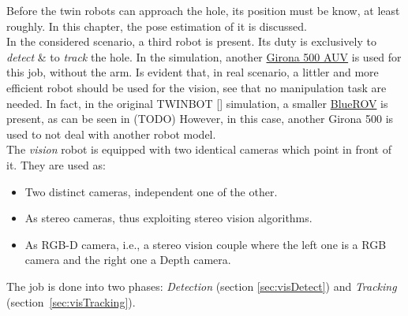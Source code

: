 Before the twin robots can approach the hole, its position must be know, at least roughly. In this chapter, the pose estimation of it is discussed.\\
In the considered scenario, a third robot is present. Its duty is exclusively to \textit{detect} \& to \textit{track} the hole. In the simulation, another \href{https://cirs.udg.edu/auvs-technology/auvs/girona-500-auv/}{Girona 500 AUV} is used for this job, without the arm. Is evident that, in real scenario, a littler and more efficient robot should be used for the vision, see that no manipulation task are needed. In fact, in the original TWINBOT [\cite{TWINBOT2019}] simulation, a smaller \href{https://bluerobotics.com/product-category/rov/bluerov2/}{BlueROV} is present, as can be seen in (TODO) %
However, in this case, another Girona 500 is used to not deal with another robot model.\\
The \textit{vision} robot is equipped with two identical cameras which point in front of it. They are used as:
\begin{itemize}
	\item Two distinct cameras, independent one of the other.
	\item As stereo cameras, thus exploiting stereo vision algorithms.
	\item As RGB-D camera, i.e., a stereo vision couple where the left one is a RGB camera and the right one a Depth camera.  
\end{itemize} 
\vspace{10px}
The job is done into two phases: \textit{Detection} (section \ref{sec:visDetect}) and \textit{Tracking} \mbox{(section \ref{sec:visTracking}).} 

